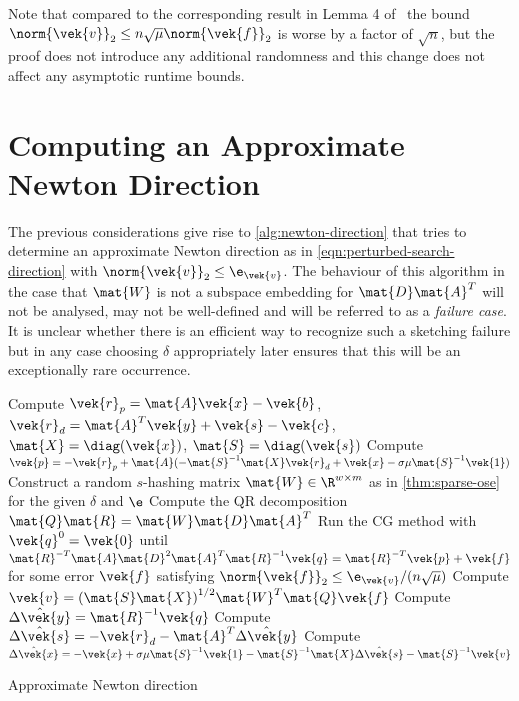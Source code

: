 Note that compared to the corresponding result in Lemma 4 of~\cite{Avron-FasterRandomizedInfeasibleIPMs} the bound \(\norm{\vek{v}}_2 \leq n \sqrt{\mu} \norm{\vek{f}}_2\) is worse by a factor of \(\sqrt{n}\), but the proof does not introduce any additional randomness and this change does not affect any asymptotic runtime bounds.

\section{Computing an Approximate Newton Direction}\label{sec:sketching-approximate-newton}

The previous considerations give rise to \cref{alg:newton-direction} that tries to determine an approximate Newton direction as in \cref{eqn:perturbed-search-direction} with \(\norm{\vek{v}}_2 \leq \e_{\vek{v}}\).
The behaviour of this algorithm in the case that \(\mat{W}\) is not a subspace embedding for \(\mat{D}\mat{A}^T\) will not be analysed, may not be well-defined and will be referred to as a \emph{failure case}.
It is unclear whether there is an efficient way to recognize such a sketching failure but in any case choosing \(\delta\) appropriately later ensures that this will be an exceptionally rare occurrence.

\begin{algorithm}
  Compute \(\vek{r}_p = \mat{A}\vek{x} - \vek{b}\), \(\vek{r}_d = \mat{A}^T \vek{y} + \vek{s} - \vek{c}\), \(\mat{X} = \diag(\vek{x})\), \(\mat{S} = \diag(\vek{s})\)\;\label{line:compute-residuals}
  Compute \(\vek{p} = -\vek{r}_p + \mat{A}(-\mat{S}^{-1}\mat{X}\vek{r}_d + \vek{x} - \sigma \mu \mat{S}^{-1} \vek{1})\)\;\label{line:compute-p}
  Construct a random \(s\)-hashing matrix \(\mat{W} \in \R^{w \times m}\) as in \cref{thm:sparse-ose} for the given \(\delta\) and \(\e\)\;\label{line:draw-sketching-matrix}
  Compute the QR decomposition \(\mat{Q} \mat{R} = \mat{W} \mat{D} \mat{A}^T\)\;\label{line:compute-qr}
  Run the CG method with \(\vek{q}^0 = \vek{0}\) until \(\mat{R}^{-T} \mat{A} \mat{D}^2 \mat{A}^T \mat{R}^{-1} \vek{q} = \mat{R}^{-T} \vek{p} + \vek{f}\) for some error \(\vek{f}\) satisfying \(\norm{\vek{f}}_2 \leq \e_{\vek{v}}/(n \sqrt{\mu})\)\;\label{line:cg}
  Compute \(\vek{v} = {(\mat{S} \mat{X})}^{1/2} \mat{W}^T \mat{Q} \vek{f}\)\;\label{line:compute-v}
  Compute \(\hat{\Delta\vek{y}} = \mat{R}^{-1}\vek{q}\)\;\label{line:compute-delta-y}
  Compute \(\hat{\Delta\vek{s}} = -\vek{r}_d - \mat{A}^T \hat{\Delta\vek{y}}\)\;\label{line:compute-delta-s}
  Compute \(\hat{\Delta\vek{x}} = -\vek{x} + \sigma \mu \mat{S}^{-1} \vek{1} - \mat{S}^{-1}\mat{X} \hat{\Delta\vek{s}} - \mat{S}^{-1} \vek{v}\)\;\label{line:compute-delta-x}
  \;
  \caption{Approximate Newton direction}\label{alg:newton-direction}
\end{algorithm}

